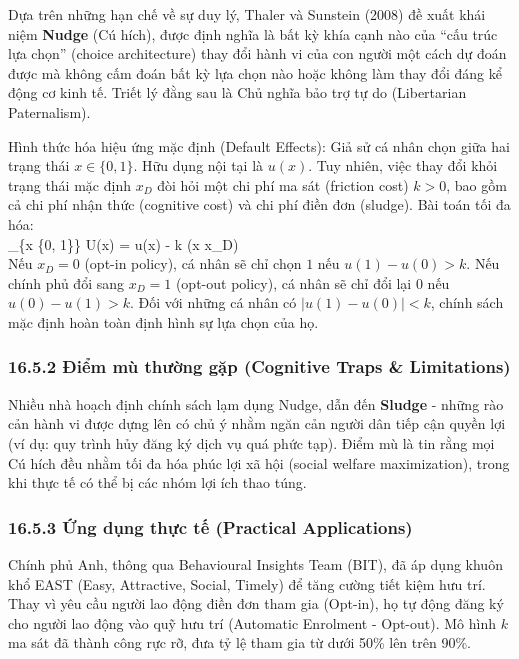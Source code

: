 \documentclass[
]{article}
\begin{document}
Dựa trên những hạn chế về sự duy lý, Thaler và Sunstein (2008) đề xuất
khái niệm \textbf{Nudge} (Cú hích), được định nghĩa là bất kỳ khía cạnh
nào của ``cấu trúc lựa chọn'' (choice architecture) thay đổi hành vi của
con người một cách dự đoán được mà không cấm đoán bất kỳ lựa chọn nào
hoặc không làm thay đổi đáng kể động cơ kinh tế. Triết lý đằng sau là
Chủ nghĩa bảo trợ tự do (Libertarian Paternalism).

Hình thức hóa hiệu ứng mặc định (Default Effects): Giả sử cá nhân chọn
giữa hai trạng thái \(x \in \{0, 1\}\). Hữu dụng nội tại là \(u(x)\).
Tuy nhiên, việc thay đổi khỏi trạng thái mặc định \(x_D\) đòi hỏi một
chi phí ma sát (friction cost) \(k > 0\), bao gồm cả chi phí nhận thức
(cognitive cost) và chi phí điền đơn (sludge). Bài toán tối đa hóa: \[
\] \max\_\{x \in \{0, 1\}\} U(x) = u(x) - k \cdot {}(x
\neq x\_D) \[
\] Nếu \(x_D = 0\) (opt-in policy), cá nhân sẽ chỉ chọn \(1\) nếu
\(u(1) - u(0) > k\). Nếu chính phủ đổi sang \(x_D = 1\) (opt-out
policy), cá nhân sẽ chỉ đổi lại \(0\) nếu \(u(0) - u(1) > k\). Đối với
những cá nhân có \(|u(1) - u(0)| < k\), chính sách mặc định hoàn toàn
định hình sự lựa chọn của họ.

\subsubsection{16.5.2 Điểm mù thường gặp (Cognitive Traps \&
Limitations)}\label{ux111iux1ec3m-muxf9-thux1b0ux1eddng-gux1eb7p-cognitive-traps-limitations-115}

Nhiều nhà hoạch định chính sách lạm dụng Nudge, dẫn đến \textbf{Sludge}
- những rào cản hành vi được dựng lên có chủ ý nhằm ngăn cản người dân
tiếp cận quyền lợi (ví dụ: quy trình hủy đăng ký dịch vụ quá phức tạp).
Điểm mù là tin rằng mọi Cú hích đều nhằm tối đa hóa phúc lợi xã hội
(social welfare maximization), trong khi thực tế có thể bị các nhóm lợi
ích thao túng.

\subsubsection{16.5.3 Ứng dụng thực tế (Practical
Applications)}\label{ux1ee9ng-dux1ee5ng-thux1ef1c-tux1ebf-practical-applications-71}

Chính phủ Anh, thông qua Behavioural Insights Team (BIT), đã áp dụng
khuôn khổ EAST (Easy, Attractive, Social, Timely) để tăng cường tiết
kiệm hưu trí. Thay vì yêu cầu người lao động điền đơn tham gia (Opt-in),
họ tự động đăng ký cho người lao động vào quỹ hưu trí (Automatic
Enrolment - Opt-out). Mô hình \(k\) ma sát đã thành công rực rỡ, đưa tỷ
lệ tham gia từ dưới 50\% lên trên 90\%.
\end{document}
